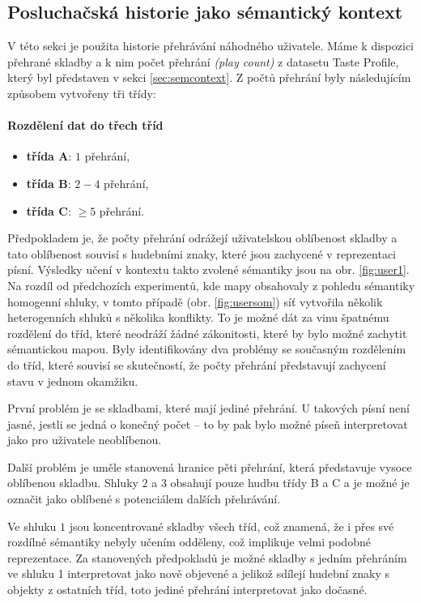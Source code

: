 \documentclass[thesis=M,czech]{FITthesis}[2012/06/26]
\begin{document}
\subsection{Posluchačská historie jako sémantický kontext}
V této sekci je použita historie přehrávání náhodného uživatele. Máme k dispozici přehrané skladby a k nim počet přehrání \textit{(play count)} z datasetu Taste Profile, který byl představen v sekci \ref{sec:semcontext}. Z počtů přehrání byly následujícím způsobem vytvořeny tři třídy:

\paragraph{Rozdělení dat do třech tříd}
\begin{itemize}
\item \textbf{třída A}: $1$ přehrání,
\item  \textbf{třída B}: $2-4$ přehrání,
\item  \textbf{třída C}: $\geq5$ přehrání.
\end{itemize}



Předpokladem je, že počty přehrání odrážejí uživatelskou oblíbenost skladby a tato oblíbenost souvisí s hudebními znaky, které jsou zachycené v reprezentaci písní. Výsledky učení v kontextu takto zvolené sémantiky jsou na obr. \ref{fig:user1}. Na rozdíl od předchozích experimentů, kde mapy obsahovaly z pohledu sémantiky homogenní shluky, v tomto případě (obr. \ref{fig:usersom}) síť vytvořila několik heterogenních shluků s několika konflikty. To je možné dát za vinu špatnému rozdělení do tříd, které neodráží žádné zákonitosti, které by bylo možné zachytit sémantickou mapou. Byly identifikovány dva problémy se současným rozdělením do tříd, které souvisí se skutečností, že počty přehrání představují zachycení stavu v jednom okamžiku.


První problém je se skladbami, které mají jediné přehrání. U takových písní není jasné, jestli se jedná o konečný počet -- to by pak bylo možné píseň interpretovat jako pro uživatele neoblíbenou. 

Další problém je uměle stanovená hranice pěti přehrání, která představuje vysoce oblíbenou skladbu. Shluky $2$ a $3$ obsahují pouze hudbu třídy B a C a je možné je označit jako oblíbené s potenciálem dalších přehrávání.

Ve shluku $1$ jsou koncentrované skladby všech tříd, což znamená, že i přes své rozdílné sémantiky nebyly učením odděleny, což implikuje  velmi podobné reprezentace. Za stanovených předpokladů je možné skladby s jedním přehráním ve shluku 1 interpretovat jako nově objevené a jelikož sdílejí hudební znaky s objekty z ostatních tříd, toto jediné přehrání interpretovat jako dočasné.
\end{document}
